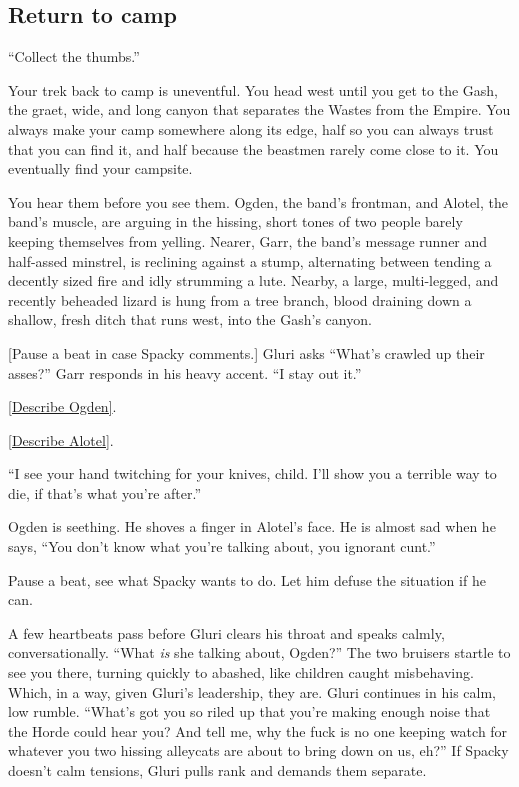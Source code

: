 \pagebreak

\begin{multicols}{2}
\subsection{Return to camp}
``Collect the thumbs.''

Your trek back to camp is uneventful.
You head west until you get to the Gash, the graet, wide, and long canyon that separates the
  Wastes from the Empire.
You always make your camp somewhere along its edge, half so you can always trust that you can find
  it, and half because the beastmen rarely come close to it.
You eventually find your campsite.

  \begin{aloud}
  You hear them before you see them.
  Ogden, the band's frontman, and Alotel, the band's muscle, are arguing in the hissing, short
    tones of two people barely keeping themselves from yelling.
  Nearer, Garr, the band's message runner and half-assed minstrel, is reclining against a stump,
    alternating between tending a decently sized fire and idly strumming a lute.
  Nearby, a large, multi-legged, and recently beheaded lizard is hung from a tree branch,
    blood draining down a shallow, fresh ditch that runs west, into the Gash's canyon.
  \end{aloud}

  [Pause a beat in case Spacky comments.]
  Gluri asks ``What's crawled up their asses?''
  Garr responds in his heavy accent.
  ``I stay out it.''

  \hyperref[description:ogden]{[Describe Ogden]}.

  \hyperref[description:alotel]{[Describe Alotel]}.

  ``I see your hand twitching for your knives, child.
    I'll show you a terrible way to die, if that's what you're after.''

  Ogden is seething.
  He shoves a finger in Alotel's face.
  He is almost sad when he says,
  ``You don't know what you're talking about, you ignorant cunt.''

  Pause a beat, see what Spacky wants to do.
  Let him defuse the situation if he can.

  A few heartbeats pass before Gluri clears his throat and speaks calmly, conversationally.
  ``What \emph{is} she talking about, Ogden?''
  The two bruisers startle to see you there, turning quickly to abashed, like children caught
    misbehaving.
  Which, in a way, given Gluri's leadership, they are.
  Gluri continues in his calm, low rumble.
  ``What's got you so riled up that you're making enough noise that the Horde could hear you?
    And tell me, why the fuck is no one keeping watch for whatever you two hissing alleycats are
      about to bring down on us, eh?''
  If Spacky doesn't calm tensions, Gluri pulls rank and demands them separate.


\end{multicols}
